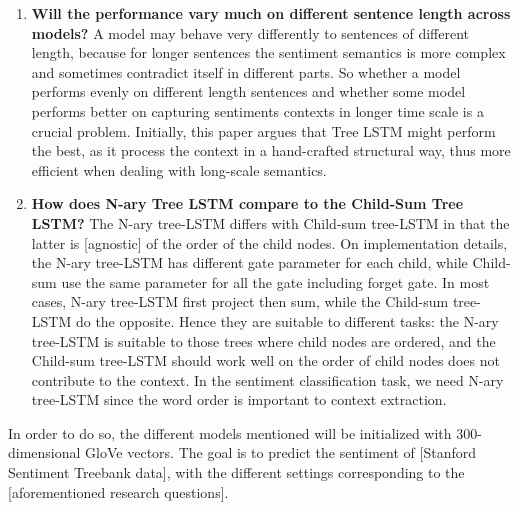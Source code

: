 \begin{enumerate}
    \item \textbf{Will the performance vary much on different sentence length across models?}
    A model may behave very differently to sentences of different length,
    because for longer sentences the sentiment semantics is more complex and
    sometimes contradict itself in different parts. So whether a model performs
    evenly on different length sentences and whether some model performs better
    on capturing sentiments contexts in longer time scale is a crucial problem.
    Initially, this paper argues that Tree LSTM might perform the best, as it
    process the context in a hand-crafted structural way, thus more efficient
    when dealing with long-scale semantics.
    \item \textbf{How does N-ary Tree LSTM compare to the Child-Sum Tree LSTM?}
    The N-ary tree-LSTM differs with Child-sum tree-LSTM in that the latter is
    [agnostic] of the order of the child nodes. On implementation details, the
    N-ary tree-LSTM has different gate parameter for each child, while Child-sum
    use the same parameter for all the gate including forget gate. In most
    cases, N-ary tree-LSTM first project then sum, while the Child-sum tree-LSTM
    do the opposite. Hence they are suitable to different tasks: the N-ary
    tree-LSTM is suitable to those trees where child nodes are ordered, and the
    Child-sum tree-LSTM should work well on the order of child nodes does not
    contribute to the context. In the sentiment classification task, we need
    N-ary tree-LSTM since the word order is important to context extraction.
\end{enumerate}

In order to do so, the different models mentioned will be initialized with
300-dimensional GloVe\cite{pennington2014glove} vectors. The goal is to predict
the sentiment of [Stanford Sentiment Treebank data], with the different settings
corresponding to the [aforementioned research questions].
